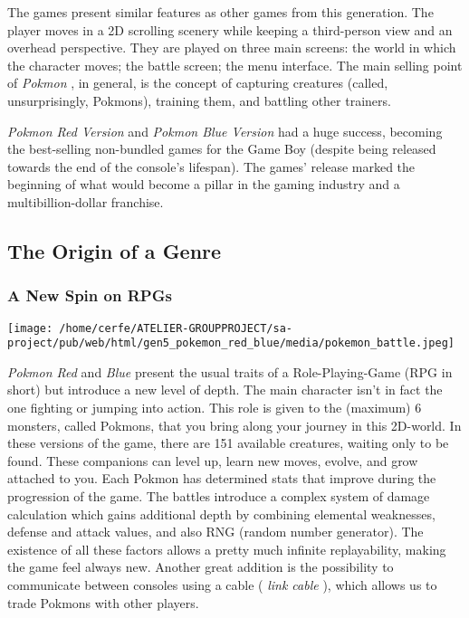 \documentclass[a4paper,10pt]{book}
\begin{document}
          The games present similar features as other games from this generation. The player moves
          in a 2D scrolling scenery while keeping a third-person view and an overhead perspective.
          They are played on three main screens: the world in which the character moves; the battle
          screen; the menu interface. The main selling point of  \textit{Pokmon }, in general, is the
          concept of capturing creatures (called, unsurprisingly, Pokmons), training them, and
          battling other trainers.
           
 \textit{Pokmon Red Version } and  \textit{Pokmon Blue Version } had a huge success, becoming the best-selling
          non-bundled games for the Game Boy (despite being released towards the end of the console's lifespan).
          The games' release marked the beginning of what would become a pillar in the gaming
          industry and a multibillion-dollar franchise.
         
 
 \subsection{The Origin of a Genre }
 
 \subsubsection{A New Spin on RPGs }
 \texttt{[image: /home/cerfe/ATELIER-GROUPPROJECT/sa-project/pub/web/html/gen5\_pokemon\_red\_blue/media/pokemon\_battle.jpeg]}
 
 \textit{Pokmon Red } and  \textit{Blue } present the usual traits of a Role-Playing-Game (RPG in short)
          but introduce a new level of depth. The main character isn't in fact the one fighting
          or jumping into action. This role is given to the (maximum) 6 monsters, called Pokmons,
          that you bring along your journey in this 2D-world. In these versions of the game, there
          are 151 available creatures, waiting only to be found. These companions can level up,
          learn new moves, evolve, and grow attached to you. Each Pokmon has determined stats that
          improve during the progression of the game. The battles introduce a complex system
          of damage calculation which gains additional depth by combining elemental weaknesses, defense and attack
          values, and also RNG (random number generator). The existence of all these factors allows
          a pretty much infinite replayability, making the game feel always new. Another great
          addition is the possibility to communicate between consoles using a cable
          ( \textit{link cable }), which allows us to trade Pokmons with other players.
         
\end{document}
